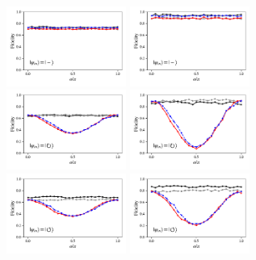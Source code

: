 \documentclass[a4paper]{article}
\begin{document}
\begin{figure}[H]
	\\
	\includegraphics[width=0.35\textwidth]{fidelity_qc4_mit1_state3}
	\includegraphics[width=0.35\textwidth]{fidelity_qc4_mit0_state3}
	\\
	\includegraphics[width=0.35\textwidth]{fidelity_qc4_mit1_state4}
	\includegraphics[width=0.35\textwidth]{fidelity_qc4_mit0_state4}
	\\
	\includegraphics[width=0.35\textwidth]{fidelity_qc4_mit1_state5}
	\includegraphics[width=0.35\textwidth]{fidelity_qc4_mit0_state5}
\end{figure}
\end{document}
